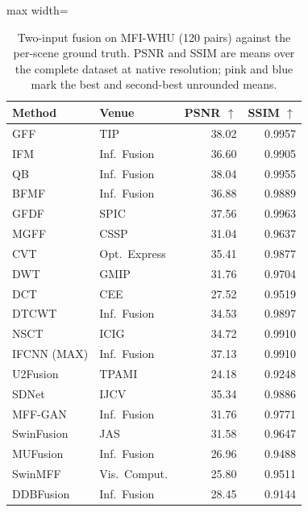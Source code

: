 \begin{table}[!htbp]
\centering\footnotesize
\setlength{\tabcolsep}{3pt}\renewcommand{\arraystretch}{0.95}
\caption{Two-input fusion on MFI-WHU (120 pairs) against the per-scene ground truth. PSNR and SSIM are means over the complete dataset at native resolution; pink and blue mark the best and second-best unrounded means.}
\label{tab:pair_ref_mfiwhu}
\begin{adjustbox}{max width=\textwidth}
\begin{tabular}{@{}llrr@{}}
\toprule
Method & Venue & PSNR $\uparrow$ & SSIM $\uparrow$ \\
\midrule
GFF & TIP~\cite{li2013image} & 38.02 & 0.9957 \\
IFM & Inf.\ Fusion~\cite{li2013matting} & 36.60 & 0.9905 \\
QB & Inf.\ Fusion~\cite{bai2015quadtree} & 38.04 & 0.9955 \\
BFMF & Inf.\ Fusion~\cite{zhang2017boundary} & 36.88 & 0.9889 \\
GFDF & SPIC~\cite{qiu2019guided} & 37.56 & 0.9963 \\
MGFF & CSSP~\cite{bavirisetti2019multiscale} & 31.04 & 0.9637 \\
\addlinespace[2pt]
CVT & Opt.\ Express~\cite{guo2012multifocus} & 35.41 & 0.9877 \\
DWT & GMIP~\cite{li1995multisensor} & 31.76 & 0.9704 \\
DCT & CEE~\cite{HAGHIGHAT2011789} & 27.52 & 0.9519 \\
DTCWT & Inf.\ Fusion~\cite{lewis2007pixel} & 34.53 & 0.9897 \\
NSCT & ICIG~\cite{yang2007image} & 34.72 & 0.9910 \\
\addlinespace[2pt]
IFCNN (MAX) & Inf.\ Fusion~\cite{zhang2020ifcnn} & 37.13 & 0.9910 \\
U2Fusion & TPAMI~\cite{xu2020u2fusion} & 24.18 & 0.9248 \\
SDNet & IJCV~\cite{zhang2021sdnet} & 35.34 & 0.9886 \\
MFF-GAN & Inf.\ Fusion~\cite{zhang2021mff} & 31.76 & 0.9771 \\
SwinFusion & JAS~\cite{ma2022swinfusion} & 31.58 & 0.9647 \\
MUFusion & Inf.\ Fusion~\cite{cheng2023mufusion} & 26.96 & 0.9488 \\
SwinMFF & Vis.\ Comput.~\cite{xie2024swinmff} & 25.80 & 0.9511 \\
DDBFusion & Inf.\ Fusion~\cite{zhang2025ddbfusion} & 28.45 & 0.9144 \\

\end{tabular}
\end{adjustbox}
\end{table}
